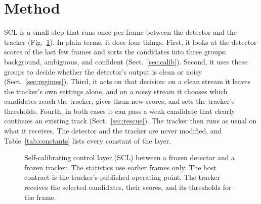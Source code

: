 \documentclass[pdflatex,sn-mathphys-num,iicol]{sn-jnl}
\newcommand{\scl}{SCL}
\begin{document}
\section{Method}\label{sec:method}

\scl{} is a small step that runs once per frame between the detector and
the tracker (Fig.~\ref{fig:arch}). In plain terms, it does four things.
First, it looks at the detector scores of the last few frames and sorts the
candidates into three groups: background, ambiguous, and confident
(Sect.~\ref{sec:calib}). Second, it uses these groups to decide whether the
detector's output is clean or noisy (Sect.~\ref{sec:regimes}). Third, it
acts on that decision: on a clean stream it leaves the tracker's own settings
alone, and on a noisy stream it chooses which candidates reach the tracker,
gives them new scores, and sets the tracker's thresholds. Fourth, in both
cases it can pass a weak candidate that clearly continues an existing track
(Sect.~\ref{sec:rescue}). The tracker then runs as usual on what it receives.
The detector and the tracker are never modified, and
Table~\ref{tab:constants} lists every constant of the layer.

\begin{figure}[t]
\centering
{}
\caption{Self-calibrating control layer (\scl{}) between a frozen detector and a
frozen tracker. The statistics use earlier frames only. The host contract is the
tracker's published operating point. The tracker receives the selected
candidates, their scores, and its thresholds for the frame.}
\label{fig:arch}
\end{figure}
\end{document}
